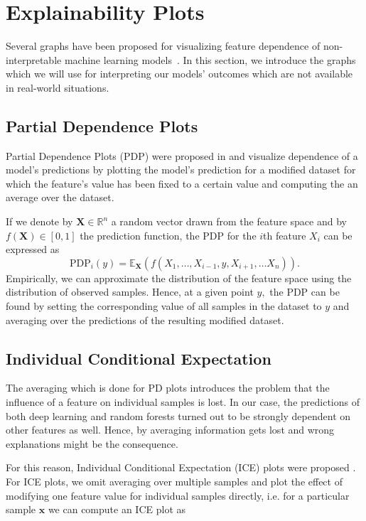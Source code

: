 \documentclass[sigconf,nonacm]{acmart}
\begin{document}
\section{Explainability Plots} \label{sec:plots}
Several graphs have been proposed for visualizing feature dependence of non-interpretable machine learning models~\cite{goldstein2015peeking, friedman2001greedy, apley2016visualizing}.
In this section, we introduce the graphs which we will use for interpreting our models' outcomes which are not available in real-world situations.
\subsection{Partial Dependence Plots}
Partial Dependence Plots (PDP) were proposed in \cite{friedman2001greedy} and visualize dependence of a model's predictions by plotting the model's prediction for a modified dataset for which the feature's value has been fixed to a certain value and computing the an average over the dataset.

If we denote by $\boldsymbol X \in \mathbb R ^n$ a random vector drawn from the feature space and by $f(\boldsymbol X) \in [0,1]$ the  prediction function, the PDP for the $i$th feature $X_i$ can be expressed as
\begin{equation}
\text{PDP}_i(y) = \mathbb E_{\boldsymbol X}\left(f(X_1,\ldots,X_{i-1},y,X_{i+1},\ldots X_n)\right) . %
\end{equation}
Empirically, we can approximate the distribution of the feature space using the distribution of observed samples. Hence, at a given point $y,$ the PDP can be found by setting the corresponding value of all samples in the dataset to $y$ and averaging over the predictions of the resulting modified dataset.

\subsection{Individual Conditional Expectation}
The averaging which is done for PD plots introduces the problem that the influence of a feature on individual samples is lost. In our case, the predictions of both deep learning and random forests turned out to be strongly dependent on other features as well. Hence, by averaging information gets lost and wrong explanations might be the consequence.

For this reason, Individual Conditional Expectation (ICE) plots were proposed \cite{goldstein2015peeking}. For ICE plots, we omit averaging over multiple samples and plot the effect of modifying one feature value for  individual samples directly, i.e. for a particular sample $\boldsymbol x$ we can compute an ICE plot as
\end{document}
